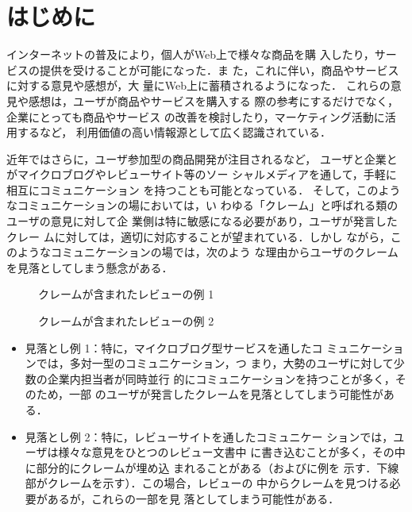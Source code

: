\documentclass[japanese]{jnlp_1.4}
\def\fig#1{}
\begin{document}
\maketitle


\section{はじめに}
\label{sec:hajimeni}

インターネットの普及により，個人がWeb上で様々な商品を購
入したり，サービスの提供を受けることが可能になった．ま
た，これに伴い，商品やサービスに対する意見や感想が，大
量にWeb上に蓄積されるようになった．
これらの意見や感想は，ユーザが商品やサービスを購入する
際の参考にするだけでなく，企業にとっても商品やサービス
の改善を検討したり，マーケティング活動に活用するなど，
利用価値の高い情報源として広く認識されている．

近年ではさらに，ユーザ参加型の商品開発が注目されるなど，
ユーザと企業とがマイクロブログやレビューサイト等のソー
シャルメディアを通して，手軽に相互にコミュニケーション
を持つことも可能となっている．
そして，このようなコミュニケーションの場においては，い
わゆる「クレーム」と呼ばれる類のユーザの意見に対して企
業側は特に敏感になる必要があり，ユーザが発言したクレー
ムに対しては，適切に対応することが望まれている．しかし
ながら，このようなコミュニケーションの場では，次のよう
な理由からユーザのクレームを見落としてしまう懸念がある．

\begin{figure}[b]

\caption{クレームが含まれたレビューの例 1}
\label{fig:review}
\end{figure}
\begin{figure}[b]

 \caption{クレームが含まれたレビューの例 2}
 \label{fig:review2}
\end{figure}

\begin{itemize}
 \item 
見落とし例 1：特に，マイクロブログ型サービスを通したコ
ミュニケーションでは，多対一型のコミュニケーション，つ
まり，大勢のユーザに対して少数の企業内担当者が同時並行
的にコミュニケーションを持つことが多く，そのため，一部
のユーザが発言したクレームを見落としてしまう可能性がある．

\item 
見落とし例 2：特に，レビューサイトを通したコミュニケー
ションでは，ユーザは様々な意見をひとつのレビュー文書中
に書き込むことが多く，その中に部分的にクレームが埋め込
まれることがある（\fig{review}および\fig{review2}に例を
  示す．下線部がクレームを示す）．この場合，レビューの
中からクレームを見つける必要があるが，これらの一部を見
落としてしまう可能性がある．

\end{itemize}
\end{document}
